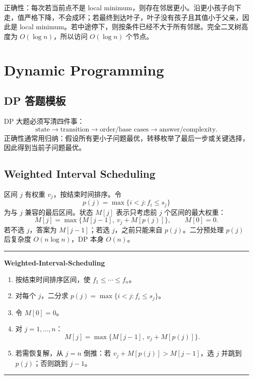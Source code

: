 \documentclass[UTF8,a4paper,11pt]{ctexart}
\newenvironment{algobox}[1]
{\par\medskip\noindent\begin{minipage}{0.96\linewidth}\hrule\vspace{0.35em}\textbf{#1}\par\vspace{0.25em}\small}
{\par\vspace{0.25em}\hrule\end{minipage}\par\medskip}
\begin{document}
\begin{center}
\end{center}

正确性：每次若当前点不是 local minimum，则存在邻居更小。沿更小孩子向下走，值严格下降，不会成环；若最终到达叶子，叶子没有孩子且其值小于父亲，因此是 local minimum。若中途停下，则按条件已经不大于所有邻居。完全二叉树高度为 $O(\log n)$，所以访问 $O(\log n)$ 个节点。

\section{Dynamic Programming}

\subsection{DP 答题模板}

DP 大题必须写清四件事：
\[
\text{state} \rightarrow \text{transition} \rightarrow \text{order/base cases} \rightarrow \text{answer/complexity}.
\]
正确性通常用归纳：假设所有更小子问题最优，转移枚举了最后一步或关键选择，因此得到当前子问题最优。

\subsection{Weighted Interval Scheduling}

区间 $j$ 有权重 $v_j$，按结束时间排序。令
\[
p(j)=\max\{i<j:f_i\le s_j\}
\]
为与 $j$ 兼容的最后区间。状态 $M[j]$ 表示只考虑前 $j$ 个区间的最大权重：
\[
M[j]=\max\{M[j-1],\ v_j+M[p(j)]\},\qquad M[0]=0.
\]
若不选 $j$，答案为 $M[j-1]$；若选 $j$，之前只能来自 $p(j)$。二分预处理 $p(j)$ 后复杂度 $O(n\log n)$，DP 本身 $O(n)$。

\begin{algobox}{Weighted-Interval-Scheduling}
\begin{enumerate}
  \item 按结束时间排序区间，使 $f_1\le\cdots\le f_n$。
  \item 对每个 $j$，二分求 $p(j)=\max\{i<j:f_i\le s_j\}$。
  \item 令 $M[0]=0$。
  \item 对 $j=1,\ldots,n$：
  \[
  M[j]=\max\{M[j-1],\ v_j+M[p(j)]\}.
  \]
  \item 若需恢复解，从 $j=n$ 倒推：若 $v_j+M[p(j)]>M[j-1]$，选 $j$ 并跳到 $p(j)$；否则跳到 $j-1$。
\end{enumerate}
\end{algobox}
\end{document}
